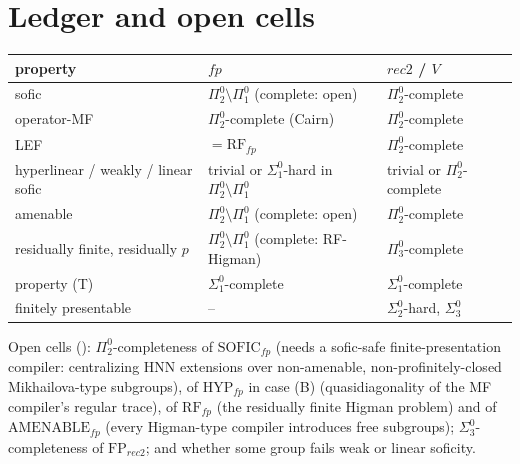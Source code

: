 \documentclass[11pt]{article}
\theoremstyle{definition}
\newcommand{\Pizt}{\Pi^0_2}\newcommand{\Sizt}{\Sigma^0_2}\newcommand{\Pith}{\Pi^0_3}\newcommand{\Sith}{\Sigma^0_3}
\newcommand{\Sio}{\Sigma^0_1}\newcommand{\Pio}{\Pi^0_1}
\begin{document}
\section{Ledger and open cells}
\begin{center}\small
\begin{tabular}{lll}
property & $fp$ & $rec2$ / $V$\\\hline
sofic & $\Pizt\setminus\Pio$ (complete: open) & $\Pizt$-complete\\
operator-MF & $\Pizt$-complete (Cairn) & $\Pizt$-complete\\
LEF & $=\mathrm{RF}_{fp}$ & $\Pizt$-complete\\
hyperlinear / weakly / linear sofic & trivial or $\Sio$-hard in $\Pizt\setminus\Pio$ & trivial or $\Pizt$-complete\\
amenable & $\Pizt\setminus\Pio$ (complete: open) & $\Pizt$-complete\\
residually finite, residually $p$ & $\Pizt\setminus\Pio$ (complete: RF-Higman) & $\Pith$-complete\\
property (T) & $\Sio$-complete & $\Sio$-complete\\
finitely presentable & -- & $\Sizt$-hard, $\Sith$
\end{tabular}
\end{center}
Open cells (): $\Pizt$-completeness of $\mathrm{SOFIC}_{fp}$ (needs a sofic-safe finite-presentation compiler: centralizing HNN extensions over non-amenable, non-profinitely-closed Mikhailova-type subgroups), of $\mathrm{HYP}_{fp}$ in case (B) (quasidiagonality of the MF compiler's regular trace), of $\mathrm{RF}_{fp}$ (the residually finite Higman problem) and of $\mathrm{AMENABLE}_{fp}$ (every Higman-type compiler introduces free subgroups); $\Sith$-completeness of $\mathrm{FP}_{rec2}$; and whether some group fails weak or linear soficity.
\end{document}
